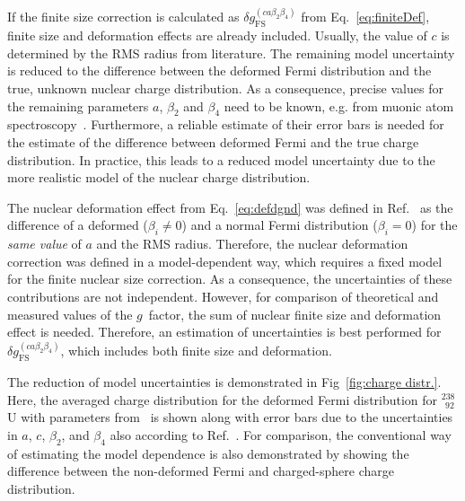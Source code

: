 If the finite size correction is calculated as $\delta g^{(ca\beta_2\beta_4)}_{\text{FS}}$ from Eq.~\eqref{eq:finiteDef}, finite size and deformation effects are already included. Usually, the value of $c$ is determined by the RMS radius from literature. The remaining model uncertainty is reduced to the difference between the deformed Fermi distribution and the true, unknown nuclear charge distribution. As a consequence, precise values for the remaining parameters $a$, $\beta_2$ and $\beta_4$ need to be known, e.g. from muonic atom spectroscopy~\cite{Close1978,hitlin1970}. Furthermore, a reliable estimate of their error bars is needed for the estimate of the difference between deformed Fermi and the true charge distribution. In practice, this leads to a reduced model uncertainty due to the more realistic model of the nuclear charge distribution.

The nuclear deformation effect from Eq.~\eqref{eq:defdgnd} was defined in Ref.~\cite{jacek2012} as the difference of a deformed ($\beta_i \neq 0$) and a normal Fermi distribution ($\beta_i=0$) for the \textit{same value} of $a$ and the RMS radius. 
Therefore, the nuclear deformation correction was defined in a model-dependent way, which requires a fixed model for the finite nuclear size correction. As a consequence, the uncertainties of these contributions are not independent. 
However, for comparison of theoretical and measured values of the $g$~factor, the sum of nuclear finite size and deformation effect is needed. Therefore, an estimation of uncertainties is best performed for $\delta g^{(ca\beta_2\beta_4)}_{\text{FS}}$, which includes both finite size and deformation.
 
The reduction of model uncertainties is demonstrated in Fig~\ref{fig:charge distr.}. Here, the averaged charge distribution for the deformed Fermi distribution for $^{238}_{\;\,92}$U with parameters from~\cite{jacek2012} is shown along with error bars due to the uncertainties in $a$, $c$, $\beta_2$, and $\beta_4$ also according to Ref.~\cite{jacek2012}. For comparison, the conventional way of estimating the model dependence is also demonstrated by showing the difference between the non-deformed Fermi and charged-sphere charge distribution.

